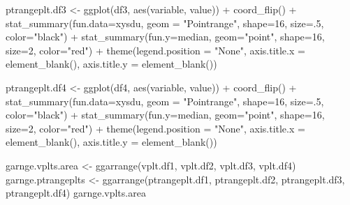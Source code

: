 \documentclass[
]{article}
\newenvironment{Shaded}{\begin{snugshade}}{\end{snugshade}}
\newcommand{\AttributeTok}[1]{\textcolor[rgb]{0.77,0.63,0.00}{#1}}
\newcommand{\DecValTok}[1]{\textcolor[rgb]{0.00,0.00,0.81}{#1}}
\newcommand{\FunctionTok}[1]{\textcolor[rgb]{0.00,0.00,0.00}{#1}}
\newcommand{\NormalTok}[1]{#1}
\newcommand{\OtherTok}[1]{\textcolor[rgb]{0.56,0.35,0.01}{#1}}
\newcommand{\SpecialCharTok}[1]{\textcolor[rgb]{0.00,0.00,0.00}{#1}}
\newcommand{\StringTok}[1]{\textcolor[rgb]{0.31,0.60,0.02}{#1}}
\begin{document}
\begin{Shaded}
\begin{Highlighting}[]
\NormalTok{ptrangeplt.df3 }\OtherTok{\textless{}{-}} \FunctionTok{ggplot}\NormalTok{(df3, }\FunctionTok{aes}\NormalTok{(variable, value)) }\SpecialCharTok{+} \FunctionTok{coord\_flip}\NormalTok{() }\SpecialCharTok{+} 
  \FunctionTok{stat\_summary}\NormalTok{(}\AttributeTok{fun.data=}\NormalTok{xysdu, }\AttributeTok{geom =} \StringTok{"Pointrange"}\NormalTok{, }\AttributeTok{shape=}\DecValTok{16}\NormalTok{, }\AttributeTok{size=}\NormalTok{.}\DecValTok{5}\NormalTok{, }\AttributeTok{color=}\StringTok{"black"}\NormalTok{) }\SpecialCharTok{+}
  \FunctionTok{stat\_summary}\NormalTok{(}\AttributeTok{fun.y=}\NormalTok{median, }\AttributeTok{geom=}\StringTok{"point"}\NormalTok{, }\AttributeTok{shape=}\DecValTok{16}\NormalTok{, }\AttributeTok{size=}\DecValTok{2}\NormalTok{, }\AttributeTok{color=}\StringTok{"red"}\NormalTok{) }\SpecialCharTok{+} 
  \FunctionTok{theme}\NormalTok{(}\AttributeTok{legend.position =} \StringTok{"None"}\NormalTok{, }\AttributeTok{axis.title.x =} \FunctionTok{element\_blank}\NormalTok{(), }\AttributeTok{axis.title.y =} \FunctionTok{element\_blank}\NormalTok{())}

\NormalTok{ptrangeplt.df4 }\OtherTok{\textless{}{-}} \FunctionTok{ggplot}\NormalTok{(df4, }\FunctionTok{aes}\NormalTok{(variable, value)) }\SpecialCharTok{+} \FunctionTok{coord\_flip}\NormalTok{() }\SpecialCharTok{+} 
  \FunctionTok{stat\_summary}\NormalTok{(}\AttributeTok{fun.data=}\NormalTok{xysdu, }\AttributeTok{geom =} \StringTok{"Pointrange"}\NormalTok{, }\AttributeTok{shape=}\DecValTok{16}\NormalTok{, }\AttributeTok{size=}\NormalTok{.}\DecValTok{5}\NormalTok{, }\AttributeTok{color=}\StringTok{"black"}\NormalTok{) }\SpecialCharTok{+}
  \FunctionTok{stat\_summary}\NormalTok{(}\AttributeTok{fun.y=}\NormalTok{median, }\AttributeTok{geom=}\StringTok{"point"}\NormalTok{, }\AttributeTok{shape=}\DecValTok{16}\NormalTok{, }\AttributeTok{size=}\DecValTok{2}\NormalTok{, }\AttributeTok{color=}\StringTok{"red"}\NormalTok{) }\SpecialCharTok{+} 
  \FunctionTok{theme}\NormalTok{(}\AttributeTok{legend.position =} \StringTok{"None"}\NormalTok{, }
        \AttributeTok{axis.title.x =} \FunctionTok{element\_blank}\NormalTok{(), }\AttributeTok{axis.title.y =} \FunctionTok{element\_blank}\NormalTok{())}

\NormalTok{garnge.vplts.area }\OtherTok{\textless{}{-}} \FunctionTok{ggarrange}\NormalTok{(vplt.df1, vplt.df2, vplt.df3, vplt.df4)}
\NormalTok{garnge.ptrangeplts }\OtherTok{\textless{}{-}} \FunctionTok{ggarrange}\NormalTok{(ptrangeplt.df1, ptrangeplt.df2, ptrangeplt.df3, ptrangeplt.df4)}
\NormalTok{garnge.vplts.area }
\end{Highlighting}
\end{Shaded}
\end{document}
